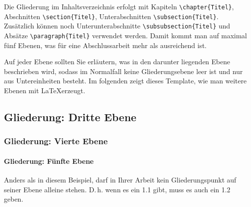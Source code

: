 Die Gliederung im Inhaltsverzeichnis erfolgt mit Kapiteln \verb+\chapter{Titel}+, Abschnitten \verb+\section{Titel}+, Unterabschnitten \verb+\subsection{Titel}+. Zusätzlich können noch Unterunterabschnitte \verb+\subsubsection{Titel}+ und Absätze \verb+\paragraph{Titel}+ verwendet werden. Damit kommt man auf maximal fünf Ebenen, was für eine Abschlussarbeit mehr als ausreichend ist.

Auf jeder Ebene sollten Sie erläutern, was in den darunter liegenden Ebene beschrieben wird, sodass im Normalfall keine Gliederungsebene leer ist und nur aus Untereinheiten besteht. Im folgenden zeigt dieses Template, wie man weitere Ebenen mit \LaTeX erzeugt.

\subsection{Gliederung: Dritte Ebene}

\label{Gliederung:EbeneDrei}


\subsubsection{Gliederung: Vierte Ebene}

\paragraph{Gliederung: Fünfte Ebene} Anders als in diesem Beispiel, darf in Ihrer Arbeit kein Gliederungspunkt auf seiner Ebene alleine stehen. D.\,h. wenn es ein 1.1 gibt, muss es auch ein 1.2 geben.
